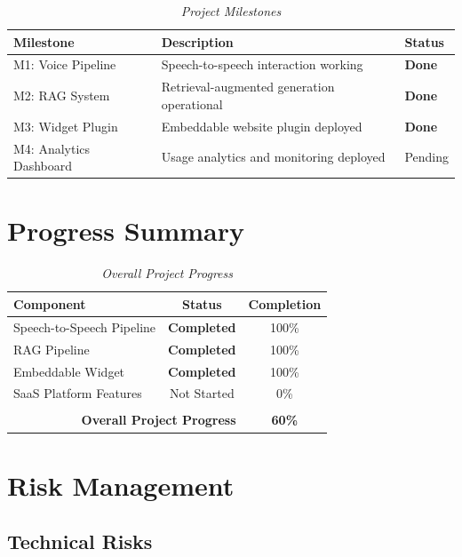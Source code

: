 \begin{table}[H]
\centering
\caption{\textit{Project Milestones}}
\begin{tabularx}{\textwidth}{|l|X|l|}
\hline
\textbf{Milestone} & \textbf{Description} & \textbf{Status} \\
\hline
M1: Voice Pipeline & Speech-to-speech interaction working & \textcolor{accentgreen}{\textbf{Done}} \\
\hline
M2: RAG System & Retrieval-augmented generation operational & \textcolor{accentgreen}{\textbf{Done}} \\
\hline
M3: Widget Plugin & Embeddable website plugin deployed & \textcolor{accentgreen}{\textbf{Done}} \\
\hline

M4: Analytics Dashboard & Usage analytics and monitoring deployed & Pending \\
\hline
\end{tabularx}
\end{table}

\section{Progress Summary}

\begin{table}[H]
\centering
\caption{\textit{Overall Project Progress}}
\begin{tabularx}{\textwidth}{|X|c|c|}
\hline
\textbf{Component} & \textbf{Status} & \textbf{Completion} \\
\hline
Speech-to-Speech Pipeline & \textcolor{accentgreen}{\textbf{Completed}} & 100\% \\
\hline
RAG Pipeline & \textcolor{accentgreen}{\textbf{Completed}} & 100\% \\
\hline
Embeddable Widget & \textcolor{accentgreen}{\textbf{Completed}} & 100\% \\
\hline
SaaS Platform Features & Not Started & 0\% \\ \\
\hline
\multicolumn{2}{|r|}{\textbf{Overall Project Progress}} & \textbf{60\%} \\
\hline
\end{tabularx}
\end{table}

\section{Risk Management}

\subsection{Technical Risks}

